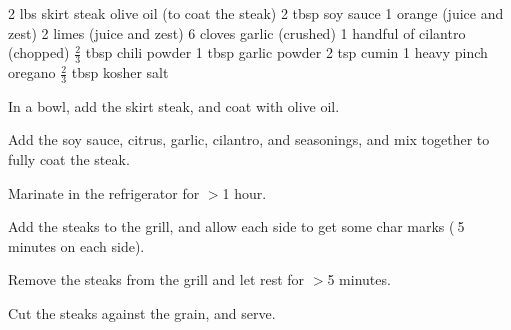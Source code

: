 \dishtype{}
\begin{ingreds}
    2 lbs skirt steak
    olive oil (to coat the steak)
    2 tbsp soy sauce
    1 orange (juice and zest)
    2 limes (juice and zest)
    6 cloves garlic (crushed)
    1 handful of cilantro (chopped)
    $\frac{2}{3}$ tbsp chili powder
    1 tbsp garlic powder
    2 tsp cumin
    1 heavy pinch oregano
    $\frac{2}{3}$ tbsp kosher salt
\end{ingreds}
\begin{method}
    In a bowl, add the skirt steak, and coat with olive oil.\par
    Add the soy sauce, citrus, garlic, cilantro, and seasonings, and mix together to fully coat the steak.\par
    Marinate in the refrigerator for $>$1 hour.\par
    Add the steaks to the grill, and allow each side to get some char marks ($~$5 minutes on each side).\par
    Remove the steaks from the grill and let rest for $>$5 minutes.\par
    Cut the steaks against the grain, and serve. 
\end{method}